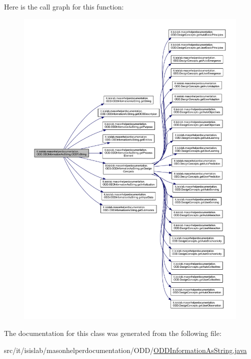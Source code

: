 Here is the call graph for this function\-:
\nopagebreak
\begin{figure}[H]
\begin{center}
\leavevmode
\includegraphics[width=350pt]{classit_1_1isislab_1_1masonhelperdocumentation_1_1_o_d_d_1_1_o_d_d_information_as_string_ab8dcbc3306a8622fe5f4b547e9b68a32_cgraph}
\end{center}
\end{figure}




The documentation for this class was generated from the following file\-:\begin{DoxyCompactItemize}
\item 
src/it/isislab/masonhelperdocumentation/\-O\-D\-D/\hyperlink{_o_d_d_information_as_string_8java}{O\-D\-D\-Information\-As\-String.\-java}\end{DoxyCompactItemize}
